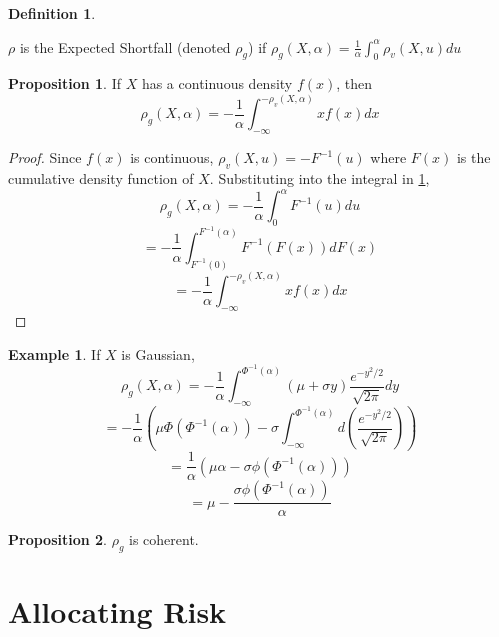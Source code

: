 \documentclass[12pt]{article}
\theoremstyle{definition}
\newtheorem{riskmeasure}{Definition}
\newtheorem{example}{Example}
\newtheorem{prop}{Proposition}
\begin{document}
\begin{riskmeasure}\label{defShortfall}

\(\rho\) is the Expected Shortfall (denoted \(\rho_g\)) if \(\rho_g (X, \alpha)=\frac{1}{\alpha}\int_0 ^ \alpha \rho_v(X, u) du\)

\end{riskmeasure}

\begin{prop}
If \(X\) has a continuous density \(f(x)\), then \[\rho_g(X, \alpha)=-\frac{1}{\alpha}\int_{-\infty} ^ {-\rho_v(X, \alpha)} x f(x) dx\]

\end{prop}

\begin{proof}
Since \(f(x)\) is continuous, \(\rho_v(X, u)=-F^{-1}(u)\) where \(F(x)\) is the cumulative density function of \(X\).  Substituting into the integral in \ref{defShortfall}, 
\[\rho_g (X, \alpha)=-\frac{1}{\alpha}\int_0 ^ \alpha F^{-1}(u) du\]
\[=-\frac{1}{\alpha}\int_{F^{-1}(0)} ^ {F^{-1}(\alpha)} F^{-1}(F(x)) dF(x)\]
\[=-\frac{1}{\alpha}\int_{-\infty} ^ {-\rho_v(X, \alpha)} x f(x) dx\]

\end{proof}

\begin{example}
If \(X\) is Gaussian,
\[\rho_g (X, \alpha)=-\frac{1}{\alpha} \int_{-\infty} ^{ \Phi ^{-1}(\alpha)} ( \mu +\sigma y) \frac{e^{-y^2 /2}}{\sqrt{2\pi}} dy\]
\[=-\frac{1}{\alpha} \left(\mu\Phi(\Phi^{-1}(\alpha))  -\sigma \int_{-\infty} ^{ \Phi ^{-1}(\alpha)} d \left(\frac{e^{-y^2 /2}}{\sqrt{2\pi}} \right) \right)\]
\[=\frac{1}{\alpha} \left(\mu\alpha  -\sigma \phi \left(\Phi^{-1}(\alpha)\right) \right)\]
\[=\mu-\frac{\sigma \phi \left( \Phi^{-1}(\alpha)\right)}{\alpha}\]

\end{example}

\begin{prop}
\(\rho_g\) is coherent.\cite{tasche2001}
\end{prop}

\section{Allocating Risk}
\end{document}
